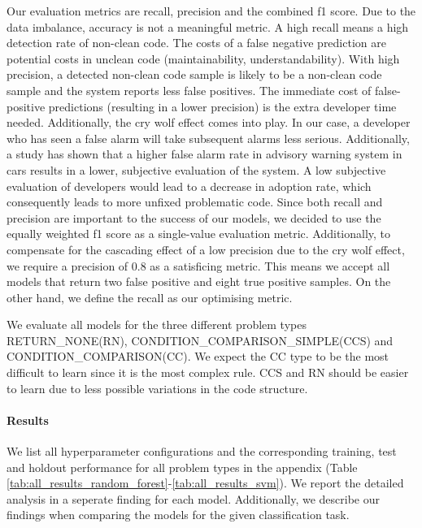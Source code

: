 Our evaluation metrics are recall, precision and the combined f1 score. Due to the data imbalance, accuracy is not a meaningful metric. A high recall means a high detection rate of non-clean code. The costs of a false negative prediction are potential costs in unclean code (maintainability, understandability). With high precision, a detected non-clean code sample is likely to be a non-clean code sample and the system reports less false positives. The immediate cost of false-positive predictions (resulting in a lower precision) is the extra developer time needed. Additionally, the cry wolf effect comes into play\cite{breznitz_cry_1984}. In our case, a developer who has seen a false alarm will take subsequent alarms less serious. Additionally, a study has shown that a higher false alarm rate in advisory warning system in cars results in a lower, subjective evaluation of the system\cite{naujoks_cooperative_2016}. A low subjective evaluation of developers would lead to a decrease in adoption rate, which consequently leads to more unfixed problematic code. Since both recall and precision are important to the success of our models, we decided to use the equally weighted f1 score as a single-value evaluation metric.
Additionally, to compensate for the cascading effect of a low precision due to the cry wolf effect, we require a precision of 0.8 as a satisficing metric. This means we accept all models that return two false positive and eight true positive samples. On the other hand, we define the recall as our optimising metric.

We evaluate all models for the three different problem types RETURN\_NONE(RN), CONDITION\_COMPARISON\_SIMPLE(CCS) and CONDITION\_COMPARISON(CC). We expect the CC type to be the most difficult to learn since it is the most complex rule. CCS and RN should be easier to learn due to less possible  variations in the code structure.

\paragraph{Results}
We list all hyperparameter configurations and the corresponding training, test and holdout performance for all problem types in the appendix (Table \ref{tab:all_results_random_forest}-\ref{tab:all_results_svm}). We report the detailed analysis in a seperate finding for each model. Additionally, we describe our findings when comparing the models for the given classification task.



